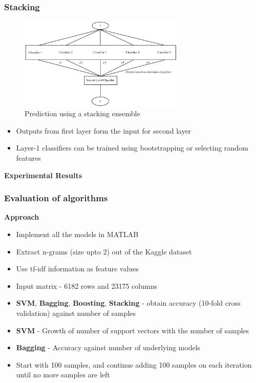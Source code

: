 \documentclass[9pt]{beamer}
\begin{document}
    \begin{frame}
        \frametitle{Stacking}
        \begin{figure}
            \centering
            \includegraphics[width=0.7\textwidth]{figures/stacking_prediction_flow.png}
            \caption{Prediction using a stacking ensemble}
        \end{figure}
        \begin{itemize}
            \item{Outputs from first layer form the input for second layer}
            \item{Layer-1 classifiers can be trained using bootstrapping or selecting random features}
        \end{itemize}
    \end{frame}
    
    \begin{frame}
        \begin{center}
            \textbf{Experimental Results}
        \end{center}
    \end{frame}
    
    \begin{frame}
        \frametitle{Evaluation of algorithms}
        \begin{center}
            \textbf{Approach}
        \end{center}
        \begin{itemize}
            \item{Implement all the models in MATLAB}
            \item{Extract n-grams (size upto 2) out of the Kaggle dataset}
            \item{Use tf-idf information as feature values}
            \item{Input matrix - 6182 rows and 23175 columns}
            \item{\textbf{SVM}, \textbf{Bagging}, \textbf{Boosting}, \textbf{Stacking} - obtain accuracy (10-fold cross validation) against number of samples}
            \item{\textbf{SVM} - Growth of number of support vectors with the number of samples}
            \item{\textbf{Bagging} - Accuracy against number of underlying models}
            \item{Start with 100 samples, and continue adding 100 samples on each iteration until no more samples are left}
        \end{itemize}
    \end{frame}
    
\end{document}
